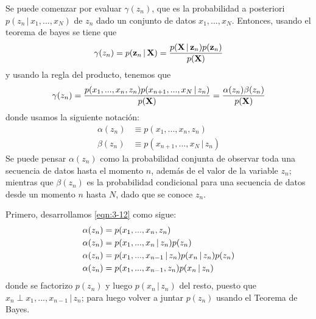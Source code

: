 Se puede comenzar por evaluar $\gamma(z_n)$, que es la probabilidad a posteriori $p(z_n \,|\, x_1, ..., x_N)$ de $z_n$ dado un conjunto de datos $x_1, ..., x_N$. Entonces, usando el teorema de bayes se tiene que
\begin{equation}
  \gamma(z_n) = p(\textbf{z}_n \,|\, \textbf{X}) = 
    \frac{p(\textbf{X} \,|\, \textbf{z}_n) p(\textbf{z}_n)}{p(\textbf{X})} 
  \label{eqn:3-10}
\end{equation}
y usando la regla del producto, tenemos que
\begin{equation}
  \gamma(z_n) = \frac{
    p(x_1, ..., x_n, z_n) p(x_{n+1}, ..., x_N \,|\, z_n) 
    }
    {p(\textbf{X})} = \frac{\alpha(z_n) \beta(z_n)}{p(\textbf{X})}
  \label{eqn:3-11}
\end{equation}
donde usamos la siguiente notación:
\begin{align}
  \alpha(z_n) &\equiv p(x_1, ..., x_n, z_n) 
\label{eqn:3-12} \\
  \beta(z_n) &\equiv p(x_{n+1}, ..., x_N \,|\, z_n) 
  \label{eqn:3-13}
\end{align}
Se puede pensar $\alpha(z_n)$ como la probabilidad conjunta de observar toda una secuencia de datos hasta el momento $n$, además de el valor de la variable $z_n$; mientras que $\beta(z_n)$ es la probabilidad condicional para una secuencia de datos desde un momento $n$ hasta $N$, dado que se conoce $z_n$. 

Primero, desarrollamos \eqref{eqn:3-12} como sigue:
\begin{align}
  \alpha(z_n) &= p(x_1, ..., x_n, z_n)  
  \notag \\ 
  \alpha(z_n) &= p(x_1, ..., x_n \,|\, z_n)  p(z_n) 
  \notag \\ 
  \alpha(z_n) &= p(x_1, ..., x_{n-1} \,|\, z_n) p(x_n \,|\, z_n)  p(z_n) 
  \notag \\ 
  \alpha(z_n) &= p(x_1, ..., x_{n-1}, z_n) p(x_n \,|\, z_n)
  \notag
\end{align}
donde se factorizo $p(z_n)$ y luego $p(x_n \,|\, z_n)$ del resto, puesto que $x_n \perp x_1, ... , x_{n-1} \,|\, z_n$; para luego volver a juntar $p(z_n)$
usando el Teorema de Bayes.

